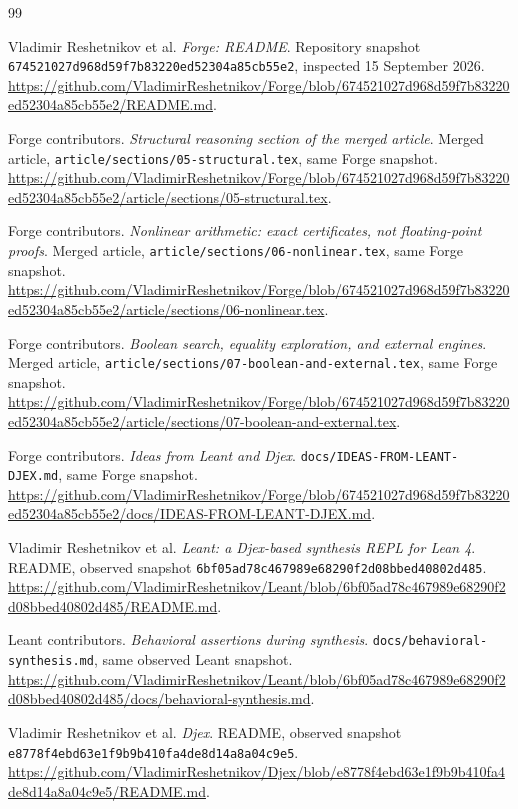 \clearpage
\begin{thebibliography}{99}
Vladimir Reshetnikov et al. \emph{Forge: README}. Repository snapshot
\texttt{674521027d968d59f7b83220ed52304a85cb55e2}, inspected 15 September 2026.
\url{https://github.com/VladimirReshetnikov/Forge/blob/674521027d968d59f7b83220ed52304a85cb55e2/README.md}.

Forge contributors. \emph{Structural reasoning section of the merged article}.
Merged article, \texttt{article/sections/05-structural.tex}, same Forge snapshot.
\url{https://github.com/VladimirReshetnikov/Forge/blob/674521027d968d59f7b83220ed52304a85cb55e2/article/sections/05-structural.tex}.

Forge contributors. \emph{Nonlinear arithmetic: exact certificates, not floating-point proofs}.
Merged article, \texttt{article/sections/06-nonlinear.tex}, same Forge snapshot.
\url{https://github.com/VladimirReshetnikov/Forge/blob/674521027d968d59f7b83220ed52304a85cb55e2/article/sections/06-nonlinear.tex}.

Forge contributors. \emph{Boolean search, equality exploration, and external engines}.
Merged article, \texttt{article/sections/07-boolean-and-external.tex}, same Forge snapshot.
\url{https://github.com/VladimirReshetnikov/Forge/blob/674521027d968d59f7b83220ed52304a85cb55e2/article/sections/07-boolean-and-external.tex}.

Forge contributors. \emph{Ideas from Leant and Djex}.
\texttt{docs/IDEAS-FROM-LEANT-DJEX.md}, same Forge snapshot.
\url{https://github.com/VladimirReshetnikov/Forge/blob/674521027d968d59f7b83220ed52304a85cb55e2/docs/IDEAS-FROM-LEANT-DJEX.md}.

Vladimir Reshetnikov et al. \emph{Leant: a Djex-based synthesis REPL for Lean 4}.
README, observed snapshot \texttt{6bf05ad78c467989e68290f2d08bbed40802d485}.
\url{https://github.com/VladimirReshetnikov/Leant/blob/6bf05ad78c467989e68290f2d08bbed40802d485/README.md}.

Leant contributors. \emph{Behavioral assertions during synthesis}.
\texttt{docs/behavioral-synthesis.md}, same observed Leant snapshot.
\url{https://github.com/VladimirReshetnikov/Leant/blob/6bf05ad78c467989e68290f2d08bbed40802d485/docs/behavioral-synthesis.md}.

Vladimir Reshetnikov et al. \emph{Djex}. README, observed snapshot
\texttt{e8778f4ebd63e1f9b9b410fa4de8d14a8a04c9e5}.
\url{https://github.com/VladimirReshetnikov/Djex/blob/e8778f4ebd63e1f9b9b410fa4de8d14a8a04c9e5/README.md}.


\end{thebibliography}
